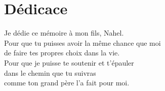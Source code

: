 \chapter*{Dédicace}
\begin{flushright}
\begin{small}

Je dédie ce mémoire à mon fils, Nahel. 
\\Pour que tu puisses avoir la même chance que moi
\\de faire tes propres choix dans la vie.
\\Pour que je puisse te soutenir et t'épauler 
\\dans le chemin que tu suivras 
\\comme ton grand père l'a fait pour moi.

\end{small}
\end{flushright}

